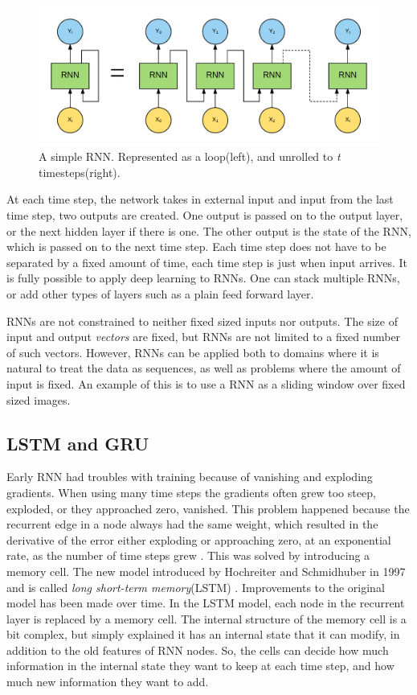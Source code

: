 \begin{figure}[htp]
	\centering
	\includegraphics[width=1.0\textwidth]{fig/rnn.png}
	\caption{A simple RNN. Represented as a loop(left), and unrolled to \textit{t} timesteps(right).}
	\label{fig:rnn}
\end{figure}

At each time step, the network takes in external input and input from the last time step, two outputs are created. One output is passed on to the output layer, or the next hidden layer if there is one. The other output is the state of the RNN, which is passed on to the next time step. Each time step does not have to be separated by a fixed amount of time, each time step is just when input arrives. It is fully possible to apply deep learning to RNNs. One can stack multiple RNNs, or add other types of layers such as a plain feed forward layer.

RNNs are not constrained to neither fixed sized inputs nor outputs. The size of input and output \textit{vectors} are fixed, but RNNs are not limited to a fixed number of such vectors. However, RNNs can be applied both to domains where it is natural to treat the data as sequences, as well as problems where the amount of input is fixed. An example of this is to use a RNN as a sliding window over fixed sized images.


\subsection{LSTM and GRU}
Early RNN had troubles with training because of vanishing and exploding gradients. When using many time steps the gradients often grew too steep, exploded, or they approached zero, vanished. This problem happened because the recurrent edge in a node always had the same weight, which resulted in the derivative of the error either exploding or approaching zero, at an exponential rate, as the number of time steps grew \cite{DBLP:journals/corr/Lipton15}. This was solved by introducing a memory cell. The new model introduced by Hochreiter and Schmidhuber in 1997 and is called \textit{long short-term memory}(LSTM) \cite{Hochreiter96bridginglong}. Improvements to the original model has been made over time. In the LSTM model, each node in the recurrent layer is replaced by a memory cell. The internal structure of the memory cell is a bit complex, but simply explained it has an internal state that it can modify, in addition to the old features of RNN nodes. So, the cells can decide how much information in the internal state they want to keep at each time step, and how much new information they want to add.

